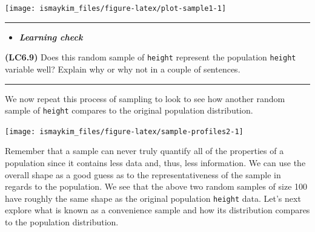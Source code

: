 \documentclass[]{tufte-book}
\newenvironment{Shaded}{\begin{snugshade}}{\end{snugshade}}
\newcommand{\KeywordTok}[1]{\textcolor[rgb]{0.13,0.29,0.53}{\textbf{{#1}}}}
\newcommand{\DataTypeTok}[1]{\textcolor[rgb]{0.13,0.29,0.53}{{#1}}}
\newcommand{\DecValTok}[1]{\textcolor[rgb]{0.00,0.00,0.81}{{#1}}}
\newcommand{\StringTok}[1]{\textcolor[rgb]{0.31,0.60,0.02}{{#1}}}
\newcommand{\OtherTok}[1]{\textcolor[rgb]{0.56,0.35,0.01}{{#1}}}
\newcommand{\NormalTok}[1]{{#1}}
\let\oldrule=\rule
\renewcommand{\rule}[1]{\oldrule{\linewidth}}
\newenvironment{rmdblock}[1]
  {\begin{shaded*}
  \begin{itemize}
  \renewcommand{\labelitemi}{
    \raisebox{-.7\height}[0pt][0pt]{
    }
  }
  \item
  }
  {
  \end{itemize}
  \end{shaded*}
  }
\newenvironment{learncheck}
  {\begin{rmdblock}{warning}}
  {\end{rmdblock}}
\begin{document}
\begin{center}\texttt{[image: ismaykim\_files/figure-latex/plot-sample1-1]} \end{center}

\begin{center}\rule{0.5\linewidth}{\linethickness}\end{center}

\begin{learncheck}
\textbf{\emph{Learning check}}
\end{learncheck}

\textbf{(LC6.9)} Does this random sample of \texttt{height} represent
the population \texttt{height} variable well? Explain why or why not in
a couple of sentences.

\begin{center}\rule{0.5\linewidth}{\linethickness}\end{center}

We now repeat this process of sampling to look to see how another random
sample of \texttt{height} compares to the original population
distribution.

\begin{Shaded}
\end{Shaded}

\begin{center}\texttt{[image: ismaykim\_files/figure-latex/sample-profiles2-1]} \end{center}

Remember that a sample can never truly quantify all of the properties of
a population since it contains less data and, thus, less information. We
can use the overall shape as a good guess as to the representativeness
of the sample in regards to the population. We see that the above two
random samples of size 100 have roughly the same shape as the original
population \texttt{height} data. Let's next explore what is known as a
convenience sample and how its distribution compares to the population
distribution.
\end{document}

